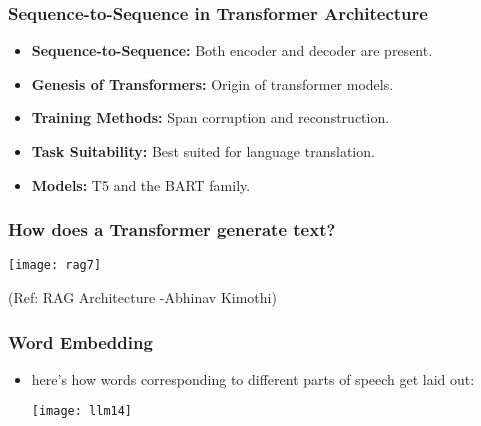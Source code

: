 \begin{frame}[fragile]\frametitle{Sequence-to-Sequence in Transformer Architecture}
\begin{itemize}
    \item \textbf{Sequence-to-Sequence:} Both encoder and decoder are present.
    \item \textbf{Genesis of Transformers:} Origin of transformer models.
    \item \textbf{Training Methods:} Span corruption and reconstruction.
    \item \textbf{Task Suitability:} Best suited for language translation.
    \item \textbf{Models:} T5 and the BART family.
\end{itemize}
\end{frame}

\begin{frame}[fragile]\frametitle{How does a Transformer generate text?}


		\begin{center}
		\texttt{[image: rag7]}
		\end{center}

{\tiny (Ref: RAG Architecture -Abhinav  Kimothi)}

\end{frame}


\begin{frame}[fragile]\frametitle{Word Embedding}

\begin{itemize}

\item here’s how words corresponding to different parts of speech get laid out:

\begin{center}
\texttt{[image: llm14]}
\end{center}

\end{itemize}

\end{frame}



